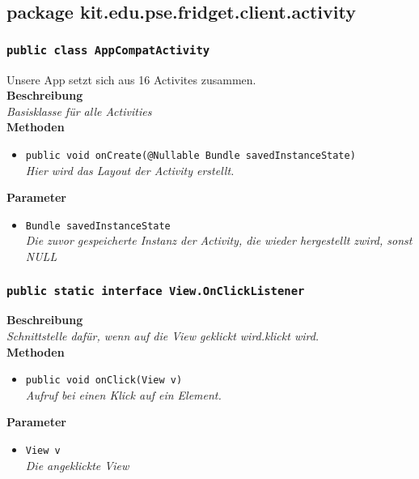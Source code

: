 \subsection{package kit.edu.pse.fridget.client.activity}
\subsubsection{\texttt{public class AppCompatActivity}}

Unsere App setzt sich aus 16 Activites zusammen.\\

	\textbf{Beschreibung} \\
	\textit{Basisklasse für alle Activities} \\

	\textbf{Methoden}
	\begin{itemize}
		\item{\texttt{public void onCreate(@Nullable Bundle savedInstanceState)}}\\
	\textit{Hier wird das Layout der Activity erstellt.}\\
	\end{itemize}

	\textbf{Parameter}
	\begin{itemize}
		\item\texttt{Bundle savedInstanceState}\\ 
	\textit{Die zuvor gespeicherte Instanz der Activity, die wieder hergestellt zwird, sonst NULL}\\
	\end{itemize}

\subsubsection{\texttt{public static interface View.OnClickListener}}

	\textbf{Beschreibung} \\
	\textit{Schnittstelle dafür, wenn auf die View geklickt wird.klickt wird.}\\

	\textbf{Methoden}
	\begin{itemize}
	\item{\texttt{public void onClick(View v)}}\\
	\textit{Aufruf bei einen Klick auf ein Element.}\\
	\end{itemize}

	\textbf{Parameter}
	\begin{itemize}
	\item\texttt{View v}\\
	\textit{Die angeklickte View}\\
	\end{itemize} 

